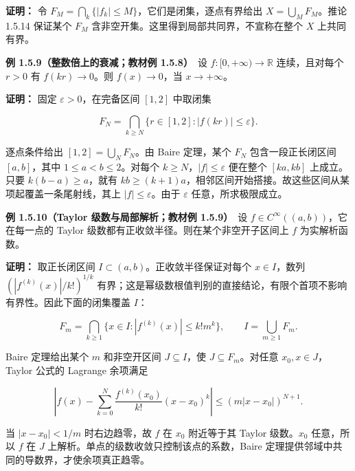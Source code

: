 \documentclass[11pt,a4paper]{article}
\begin{document}
\textbf{证明：} 令
\(F_M=\bigcap_k\{|f_k|\le M\}\)，它们是闭集，逐点有界给出
\(X=\bigcup_MF_M\)。推论 1.5.14 保证某个 \(F_M\)
含非空开集。这里得到局部共同界，不宣称在整个 \(X\) 上共同有界。

\textbf{例 1.5.9（整数倍上的衰减；教材例 1.5.8）}　设
\(f:[0,+\infty)\to\mathbb R\) 连续，且对每个 \(r>0\) 有
\(f(kr)\to0\)。则 \(f(x)\to0\)，当 \(x\to+\infty\)。

\textbf{证明：} 固定 \(\varepsilon>0\)，在完备区间 \([1,2]\) 中取闭集

\begin{equation*}
F_N=\bigcap_{k\ge N}\{r\in[1,2]:|f(kr)|\le\varepsilon\}.
\tag{1.5.17}
\end{equation*}

逐点条件给出 \([1,2]=\bigcup_NF_N\)。由 Baire 定理，某个 \(F_N\)
包含一段正长闭区间 \([a,b]\)，其中 \(1\le a<b\le2\)。对每个
\(k\ge N\)，\(|f|\le\varepsilon\) 便在整个 \([ka,kb]\) 上成立。只要
\(k(b-a)\ge a\)，就有
\(kb\ge(k+1)a\)，相邻区间开始搭接。故这些区间从某项起覆盖一条尾射线，其上
\(|f|\le\varepsilon\)。由于 \(\varepsilon\) 任意，所求极限成立。

\textbf{例 1.5.10（Taylor 级数与局部解析；教材例 1.5.9）}　设
\(f\in C^\infty((a,b))\)，它在每一点的 Taylor
级数都有正收敛半径。则在某个非空开子区间上 \(f\) 为实解析函数。

\textbf{证明：} 取正长闭区间 \(I\subset(a,b)\)。正收敛半径保证对每个
\(x\in I\)，数列 \((|f^{(k)}(x)|/k!)^{1/k}\)
有界；这是幂级数根值判别的直接结论，有限个首项不影响有界性。因此下面的闭集覆盖
\(I\)：

\begin{equation*}
F_m=\bigcap_{k\ge1}\{x\in I:|f^{(k)}(x)|\le k!m^k\},\qquad I=\bigcup_{m\ge1}F_m.
\tag{1.5.18}
\end{equation*}

Baire 定理给出某个 \(m\) 和非空开区间 \(J\subseteq I\)，使
\(J\subseteq F_m\)。对任意 \(x_0,x\in J\)，Taylor 公式的 Lagrange
余项满足

\begin{equation*}
\left|f(x)-\sum_{k=0}^N\frac{f^{(k)}(x_0)}{k!}(x-x_0)^k\right|
\le (m|x-x_0|)^{N+1}.
\tag{1.5.19}
\end{equation*}

当 \(|x-x_0|<1/m\) 时右边趋零，故 \(f\) 在 \(x_0\) 附近等于其 Taylor
级数。\(x_0\) 任意，所以 \(f\) 在 \(J\)
上解析。单点的级数收敛只控制该点的系数，Baire
定理提供邻域中共同的导数界，才使余项真正趋零。
\end{document}
